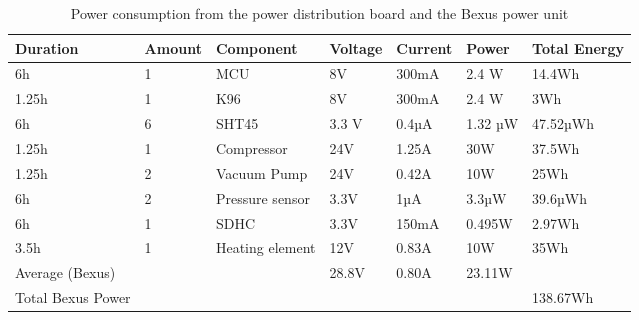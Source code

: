 \documentclass[ %
  a4paper, %
  11pt, %
  openany, %
  parskip, %
  toc=totoc, %
  listof=totoc, %
  bibliography=totoc %
]{scrreprt} %
\providecommand{\DIFaddbeginFL}{} %
\providecommand{\DIFaddendFL}{} %
\providecommand{\DIFdelbeginFL}{} %
\providecommand{\DIFdelendFL}{} %
\providecommand{\DIFscaledelfig}{0.5}
\newlength{\DIFdelgraphicswidth} %
\newlength{\DIFdelgraphicsheight} %
\providecommand{\DIFaddincludegraphics}[2][]{{\color{blue}\fbox{\DIFOincludegraphics[#1]{#2}}}} %
\providecommand{\DIFdelincludegraphics}[2][]{%
\sbox{\DIFdelgraphicsbox}{\DIFOincludegraphics[#1]{#2}}%
\settoboxwidth{\DIFdelgraphicswidth}{\DIFdelgraphicsbox} %
\settoboxtotalheight{\DIFdelgraphicsheight}{\DIFdelgraphicsbox} %
\scalebox{\DIFscaledelfig}{%
\parbox[b]{\DIFdelgraphicswidth}{\usebox{\DIFdelgraphicsbox}\\[-\baselineskip] \rule{\DIFdelgraphicswidth}{0em}}\llap{\resizebox{\DIFdelgraphicswidth}{\DIFdelgraphicsheight}{%
\setlength{\unitlength}{\DIFdelgraphicswidth}%
\begin{picture}(1,1)%
\thicklines\linethickness{2pt} %
{\color[rgb]{1,0,0}\put(0,0){\framebox(1,1){}}}%
{\color[rgb]{1,0,0}\put(0,0){\line( 1,1){1}}}%
{\color[rgb]{1,0,0}\put(0,1){\line(1,-1){1}}}%
\end{picture}%
}\hspace*{3pt}}} %
} %
\DeclareRobustCommand{\DIFaddbeginFL}{\DIFOaddbeginFL \let\includegraphics\DIFaddincludegraphics} %
\DeclareRobustCommand{\DIFaddendFL}{\DIFOaddendFL \let\includegraphics\DIFOincludegraphics} %
\DeclareRobustCommand{\DIFdelbeginFL}{\DIFOdelbeginFL \let\includegraphics\DIFdelincludegraphics} %
\DeclareRobustCommand{\DIFdelendFL}{\DIFOaddendFL \let\includegraphics\DIFOincludegraphics} %
\begin{document}
\begin{table}[H]
\centering
\caption{Power consumption from the power distribution board and the Bexus power unit}
\label{tab:power_consumption}
\DIFdelbeginFL %
\DIFdelendFL \DIFaddbeginFL \begin{tabular}{L{1.6cm}llllll}
\toprule
\textbf{Duration} & \textbf{Amount} & \textbf{Component} & \textbf{Voltage} & \textbf{Current} & \textbf{Power} & \textbf{Total Energy} \\
\midrule
6h & 1 & MCU & 8V & 300mA & 2.4 W & 14.4Wh \\
1.25h & 1 & K96 & 8V & 300mA & 2.4 W & 3Wh \\
6h & 6 & SHT45 & 3.3 V & 0.4µA & 1.32 µW & 47.52µWh \\
1.25h & 1 & Compressor & 24V & 1.25A & 30W & 37.5Wh \\
1.25h & 2 & Vacuum Pump & 24V & 0.42A & 10W & 25Wh \\
6h & 2 & Pressure sensor & 3.3V & 1µA & 3.3µW & 39.6µWh \\
6h & 1 &SDHC &3.3V& 150mA & 0.495W & 2.97Wh \\
3.5h & 1 &Heating element &12V& 0.83A & 10W & 35Wh \\

\midrule
Average (Bexus) & & & 28.8V & 0.80A & 23.11W\\
Total Bexus Power & & & & & & 138.67Wh \\
\bottomrule
\end{tabular}\DIFaddendFL 
\end{table}
\end{document}
